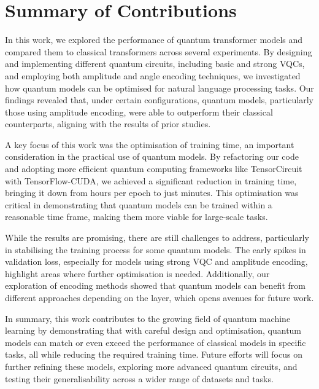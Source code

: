 \section{Summary of Contributions}
\label{sec:summary_of_contributions}
In this work, we explored the performance of quantum transformer
models and compared them to classical transformers across several
experiments. By designing and implementing different quantum
circuits, including basic and strong VQCs, and employing both
amplitude and angle encoding techniques, we investigated how quantum
models can be optimised for natural language processing tasks. Our
findings revealed that, under certain configurations, quantum models,
particularly those using amplitude encoding, were able to outperform
their classical counterparts, aligning with the results of prior studies.

A key focus of this work was the optimisation of training time, an
important consideration in the practical use of quantum models. By
refactoring our code and adopting more efficient quantum computing
frameworks like TensorCircuit with TensorFlow-CUDA, we achieved a
significant reduction in training time, bringing it down from hours
per epoch to just minutes. This optimisation was critical in
demonstrating that quantum models can be trained within a reasonable
time frame, making them more viable for large-scale tasks.

While the results are promising, there are still challenges to
address, particularly in stabilising the training process for some
quantum models. The early spikes in validation loss, especially for
models using strong VQC and amplitude encoding, highlight areas where
further optimisation is needed. Additionally, our exploration of
encoding methods showed that quantum models can benefit from
different approaches depending on the layer, which opens avenues for
future work.

In summary, this work contributes to the growing field of quantum
machine learning by demonstrating that with careful design and
optimisation, quantum models can match or even exceed the performance
of classical models in specific tasks, all while reducing the
required training time. Future efforts will focus on further refining
these models, exploring more advanced quantum circuits, and testing
their generalisability across a wider range of datasets and tasks.

